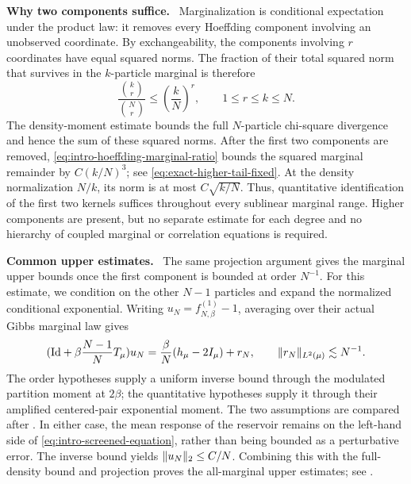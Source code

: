 \documentclass[11pt,reqno]{amsart}
\numberwithin{equation}{section}
\theoremstyle{plain}
\theoremstyle{remark}
\DeclarePairedDelimiter{\pa}{\lparen}{\rparen}
\DeclarePairedDelimiter{\norm}{\lVert}{\rVert}
\newcommand{\be}{\beta}
\newcommand{\parheading}[1]{\par\medskip\noindent\textbf{#1}\ }
\begin{document}
\parheading{Why two components suffice.}
Marginalization is conditional expectation under the product law: it removes every Hoeffding component involving an unobserved coordinate.  By exchangeability, the components involving $r$ coordinates have equal squared norms.  The fraction of their total squared norm that survives in the $k$-particle marginal is therefore
\begin{equation}\label{eq:intro-hoeffding-marginal-ratio}
 \frac{\binom{k}{r}}{\binom{N}{r}}
 \leq\left(\frac{k}{N}\right)^r,
 \qquad 1\leq r\leq k\leq N.
\end{equation}
The density-moment estimate bounds the full $N$-particle chi-square divergence and hence the sum of these squared norms.  After the first two components are removed, \eqref{eq:intro-hoeffding-marginal-ratio} bounds the squared marginal remainder by $C(k/N)^3$; see \eqref{eq:exact-higher-tail-fixed}.  At the density normalization $N/k$, its norm is at most $C\sqrt{k/N}$.  Thus, quantitative identification of the first two kernels suffices throughout every sublinear marginal range.  Higher components are present, but no separate estimate for each degree and no hierarchy of coupled marginal or correlation equations is required.

\parheading{Common upper estimates.}
The same projection argument gives the marginal upper bounds once the first component is bounded at order $N^{-1}$.  For this estimate, we condition on the other $N-1$ particles and expand the normalized conditional exponential.  Writing $u_N=f_{N,\be}^{(1)}-1$, averaging over their actual Gibbs marginal law gives
\begin{align}\label{eq:intro-screened-equation}
 \pa{\mathrm{Id}+\be\frac{N-1}{N}T_\mu}u_N
 =\frac{\be}{N}(h_\mu-2I_\mu)+r_N,
 \qquad \norm{r_N}_{L^2(\mu)}\lesssim N^{-1}.
\end{align}
The order hypotheses supply a uniform inverse bound through the modulated partition moment at $2\be$; the quantitative hypotheses supply it through their amplified centered-pair exponential moment.  The two assumptions are compared after .  In either case, the mean response of the reservoir remains on the left-hand side of \eqref{eq:intro-screened-equation}, rather than being bounded as a perturbative error.  The inverse bound yields $\norm{u_N}_2\leq C/N$.  Combining this with the full-density bound and projection proves the all-marginal upper estimates; see .
\end{document}
